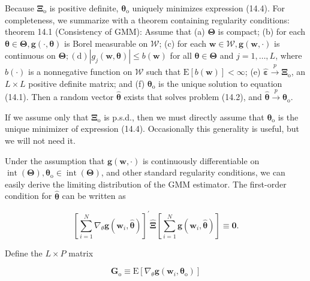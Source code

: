 \documentclass[10pt]{article}
\begin{document}
Because $\boldsymbol{\Xi}_{\mathrm{o}}$ is positive definite, $\boldsymbol{\theta}_{\mathrm{o}}$ uniquely minimizes expression (14.4). For completeness, we summarize with a theorem containing regularity conditions:\\
theorem 14.1 (Consistency of GMM): Assume that (a) $\boldsymbol{\Theta}$ is compact; (b) for each $\boldsymbol{\theta} \in \boldsymbol{\Theta}, \mathbf{g}(\cdot, \boldsymbol{\theta})$ is Borel measurable on $\mathscr{W}$; (c) for each $\mathbf{w} \in \mathscr{W}, \mathbf{g}(\mathbf{w}, \cdot)$ is continuous on $\boldsymbol{\Theta} ;(\mathrm{d})\left|g_{j}(\mathbf{w}, \boldsymbol{\theta})\right| \leq b(\mathbf{w})$ for all $\boldsymbol{\theta} \in \boldsymbol{\Theta}$ and $j=1, \ldots, L$, where $b(\cdot)$ is a nonnegative function on $\mathscr{W}$ such that $\mathrm{E}[b(\mathbf{w})]<\infty$; (e) $\hat{\boldsymbol{\varepsilon}} \xrightarrow{p} \boldsymbol{\Xi}_{\mathrm{o}}$, an $L \times L$ positive definite matrix; and (f) $\boldsymbol{\theta}_{\mathrm{o}}$ is the unique solution to equation (14.1). Then a random vector $\hat{\boldsymbol{\theta}}$ exists that solves problem (14.2), and $\hat{\boldsymbol{\theta}} \xrightarrow{p} \boldsymbol{\theta}_{\mathrm{o}}$.

If we assume only that $\boldsymbol{\Xi}_{\mathrm{o}}$ is p.s.d., then we must directly assume that $\boldsymbol{\theta}_{\mathrm{o}}$ is the unique minimizer of expression (14.4). Occasionally this generality is useful, but we will not need it.

Under the assumption that $\mathbf{g}(\mathbf{w}, \cdot)$ is continuously differentiable on $\operatorname{int}(\boldsymbol{\Theta}), \boldsymbol{\theta}_{\mathrm{o}} \in \operatorname{int}(\boldsymbol{\Theta})$, and other standard regularity conditions, we can easily derive the limiting distribution of the GMM estimator. The first-order condition for $\hat{\boldsymbol{\theta}}$ can be written as


\begin{equation*}
\left[\sum_{i=1}^{N} \nabla_{\theta} \mathbf{g}\left(\mathbf{w}_{i}, \hat{\boldsymbol{\theta}}\right)\right]^{\prime} \hat{\boldsymbol{\Xi}}\left[\sum_{i=1}^{N} \mathbf{g}\left(\mathbf{w}_{i}, \hat{\boldsymbol{\theta}}\right)\right] \equiv \mathbf{0} . \tag{14.5}
\end{equation*}


Define the $L \times P$ matrix


\begin{equation*}
\mathbf{G}_{\mathrm{o}} \equiv \mathrm{E}\left[\nabla_{\theta} \mathbf{g}\left(\mathbf{w}_{i}, \boldsymbol{\theta}_{\mathrm{o}}\right)\right] \tag{14.6}
\end{equation*}
\end{document}
